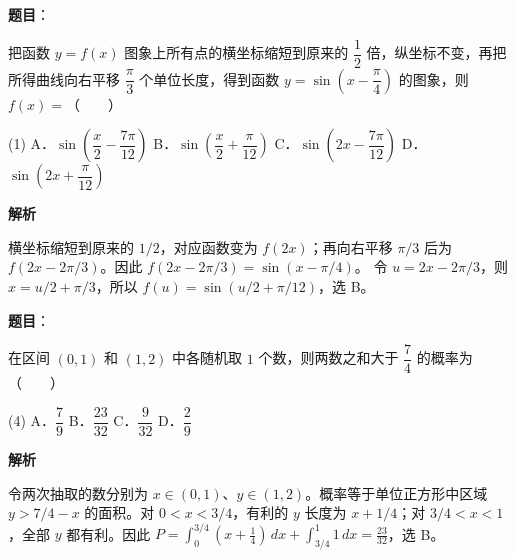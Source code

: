 \begin{answer}

\textbf{题目}：

把函数 $y=f(x)$ 图象上所有点的横坐标缩短到原来的 $\dfrac12$ 倍，纵坐标不变，再把所得曲线向右平移 $\dfrac{\pi}{3}$ 个单位长度，得到函数 $y=\sin\left(x-\dfrac{\pi}{4}\right)$ 的图象，则 $f(x)=$\mbox{（　　）}

\begin{gkopts}(1)
\task A．$\sin\left(\dfrac{x}{2}-\dfrac{7\pi}{12}\right)$
\task B．$\sin\left(\dfrac{x}{2}+\dfrac{\pi}{12}\right)$
\task C．$\sin\left(2x-\dfrac{7\pi}{12}\right)$
\task D．$\sin\left(2x+\dfrac{\pi}{12}\right)$
\end{gkopts}

\textbf{解析}

横坐标缩短到原来的 $1/2$，对应函数变为 $f(2x)$；再向右平移 $\pi/3$ 后为 $f(2x-2\pi/3)$。因此
$f(2x-2\pi/3)=\sin(x-\pi/4)$。
令 $u=2x-2\pi/3$，则 $x=u/2+\pi/3$，所以
$f(u)=\sin(u/2+\pi/12)$，选 B。


\end{answer}
\begin{answer}

\textbf{题目}：

在区间 $(0,1)$ 和 $(1,2)$ 中各随机取 $1$ 个数，则两数之和大于 $\dfrac74$ 的概率为\mbox{（　　）}

\begin{gkopts}(4)
\task A．$\dfrac79$
\task B．$\dfrac{23}{32}$
\task C．$\dfrac9{32}$
\task D．$\dfrac29$
\end{gkopts}

\textbf{解析}

令两次抽取的数分别为 $x\in(0,1)$、$y\in(1,2)$。概率等于单位正方形中区域 $y>7/4-x$ 的面积。对 $0<x<3/4$，有利的 $y$ 长度为 $x+1/4$；对 $3/4<x<1$，全部 $y$ 都有利。因此
$P=\int_0^{3/4}(x+\tfrac14)\,dx+\int_{3/4}^1 1\,dx=\tfrac{23}{32}$，选 B。


\end{answer}
